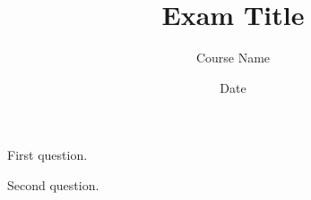 \documentclass[11pt]{exam}
\begin{document}
\title{Exam Title}
\author{Course Name}
\date{Date}
\maketitle
\begin{questions}
\question[10] First question.

\question[10] Second question.
\end{questions}
\end{document}
